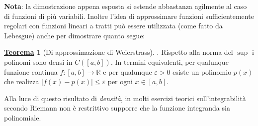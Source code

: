 \documentclass[a4paper,twoside]{article}
\renewcommand{\epsilon}{\varepsilon}
\newcommand{\R}{\mathbb{R}}
\theoremstyle{definition}
\newtheorem{theorem}{\color{Red}\underline{\textrm Teorema}}
\numberwithin{theorem}{section}
\begin{document}
\textbf{Nota}: la dimostrazione appena esposta si estende abbastanza agilmente al caso di funzioni di più variabili. Inoltre l'idea di approssimare funzioni sufficientemente regolari con funzioni lineari a tratti può essere utilizzata (come fatto da Lebesgue) anche per dimostrare quanto segue:

\begin{theorem}[Di approssimazione di Weierstrass]. Rispetto alla norma del $\sup$ i polinomi sono densi in $C([a,b])$. In termini equivalenti, per qualunque funzione continua $f:[a,b]\to\R$ e per qualunque $\epsilon > 0$ esiste un polinomio $p(x)$ che realizza $|f(x)-p(x)|\leq\epsilon$ per ogni $x\in[a,b]$. 
\end{theorem}

Alla luce di questo risultato di \emph{densità}, in molti esercizi teorici sull'integrabilità secondo Riemann non è restrittivo supporre che la funzione integranda sia polinomiale.
\end{document}
